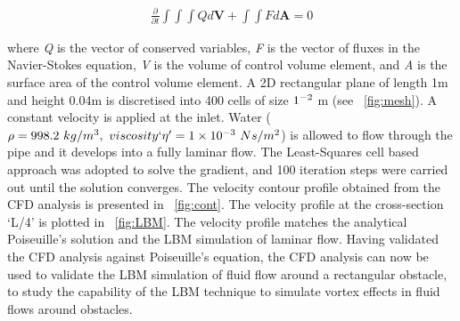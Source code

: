\begin{align}
\frac{\partial}{\partial t} \int\int\int  Q d\mathbf{V} + \int\int \mathit{F} d\mathbf{A} = 0
\end{align}

where \textit{Q} is the vector of conserved variables, \textit{F} is the vector of fluxes in the Navier-Stokes equation, \textit{V} is the volume of control volume element, and \textit{A} is the surface area of the control volume element. A 2D rectangular plane of length 1m and height 0.04m is discretised into 400 cells of size $1 \time 10^{-2} $ m (see ~\cref{fig:mesh}). A constant velocity is applied at the inlet. Water ($\rho = 998.2\mbox{ }kg/m^{3},\mbox{ } viscosity`\eta'=1 \times 10^{-3}\mbox{ } Ns/m^{2} $) is allowed to flow through the pipe and it develops into a fully laminar flow. The Least-Squares cell based approach was adopted to solve the gradient, and 100 iteration steps were carried out until the solution converges. The velocity contour profile obtained from the CFD analysis is presented in ~\cref{fig:cont}. The velocity profile at the cross-section `L/4' is plotted in ~\cref{fig:LBM}. The velocity profile matches the analytical Poiseuille's solution and the LBM simulation of laminar flow. Having validated the CFD analysis against Poiseuille's equation, the CFD analysis can now be used to validate the LBM simulation of fluid flow around a rectangular obstacle, to study the capability of the LBM technique to simulate vortex effects in fluid flows around obstacles.

